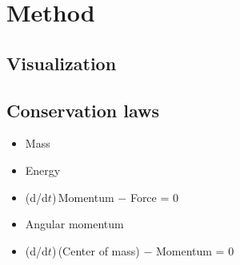 \part{Method}






\chapter{Visualization}

\chapter{Conservation laws}

\begin{itemize}
    \item Mass
    \item Energy
    \item (d/d$t$)\,Momentum $-$ Force = 0
    \item Angular momentum
    \item (d/d$t$)\,(Center of mass) $-$ Momentum = 0
\end{itemize}